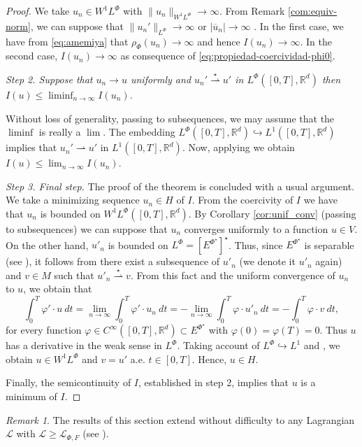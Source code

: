 \documentclass[twoside]{article}
\theoremstyle{remark}
\newtheorem{comentario}{Remark}
\newcommand{\orlnor}{\|_{L^{\Phi}}}
\newcommand{\lphi}{L^{\Phi}}
\newcommand{\wphi}{W^{1}\lphi}
\newcommand{\sobnor}{\|_{W^{1}\lphi}}
\newcommand{\rr}{\mathbb{R}}
\renewcommand{\leq}{\leqslant}
\renewcommand{\geq}{\geqslant}
\newcommand{\epsi}{E^{\Phi^{\star}}}
\begin{document}
\begin{proof}
We take $u_n\in\wphi$ with $\|u_n\sobnor\to\infty$. From Remark \ref{com:equiv-norm}, we can suppose that $\|u_n'\orlnor \to \infty$ or $|\overline{u}_n|\to \infty$ . In the first case, we have from \eqref{eq:amemiya} that $\rho_\Phi(u_n)\to\infty$ and hence  $I(u_n)\to\infty$. In the second case,  $I(u_n)\to\infty$ as consequence of \eqref{eq:propiedad-coercividad-phi0}.





\emph{Step 2. Suppose that $u_n\to u$ uniformly and $u_n'\overset{\star}{\rightharpoonup} u'$ in $\lphi([0,T],\rr^d)$ then
$
I(u)\leq\liminf_{n\to\infty}I(u_n)
$.
}  


  Without loss of generality, passing to subsequences, we may assume that the $\liminf$ is really a $\lim$. The embedding  $\lphi([0,T],\rr^d)\hookrightarrow L^1([0,T],\rr^d)$ implies that  $u_n'\rightharpoonup u' $ in $ L^1([0,T],\rr^d)$.  Now, applying \cite[Thm. 3.6]{buttazzo1998one} we obtain $I(u)\leq \lim_{n\to\infty}I(u_n)$.

\emph{Step 3. Final step.}
The proof of the theorem is concluded with a usual argument. We take a minimizing sequence $u_n \in H$ of $I$. 
From the coercivity of $I$ we have that $u_n$ is bounded on $\wphi([0,T],\rr^d)$. By Corollary \ref{cor:unif_conv}  (passing to subsequences) we can suppose that $u_n$ converges uniformly to a function $u\in V$. 
On the other hand, $u'_n$ is bounded on $\lphi=\left[\epsi\right]^\star$. Thus,  
since $E^{\Phi^{\star}}$ is separable (see \cite[Thm. 6.3]{Orliczvectorial2005}), it follows from \cite[Cor. 3.30]{brezis2010functional} 
there exist a subsequence of $u'_n$ (we denote it $u'_n$ again) and $v \in M$ such that $u'_n\overset{\star}{\rightharpoonup}v$. From this fact and the uniform convergence of $u_n$ to $u$, we obtain that
\[
\int_0^T\varphi'\cdot u\ dt=\lim_{n\to\infty}\int_0^T\varphi'\cdot u_n \ dt=
-\lim_{n\to\infty}\int_0^T\varphi\cdot u'_n\ dt=-\int_0^T\varphi\cdot v\ dt,
\]
for every function $\varphi\in C^{\infty}([0,T],\rr^d)\subset\epsi$ with $\varphi(0)= \varphi(T)=0$.
Thus $u$ has a  derivative in the weak sense in $\lphi$. Taking account of 
$\lphi \hookrightarrow L^1$ and \cite[Thms. 2.3 and 2.17 ]{buttazzo1998one}, 
we obtain $u\in \wphi$ and $v=u'$ a.e. $t\in [0,T]$.
Hence, $u \in H$. 

Finally, the semicontinuity of $I$, established in step 2,  implies that $u$ is a minimum of $I$.
\end{proof}


\begin{comentario} The results of this section extend without difficulty to any Lagrangian $\mathcal{L}$ with $\mathcal{L}\geq \mathcal{L}_{\Phi,F}$ (see \cite{ABGMS2015}).
\end{comentario}
\end{document}
